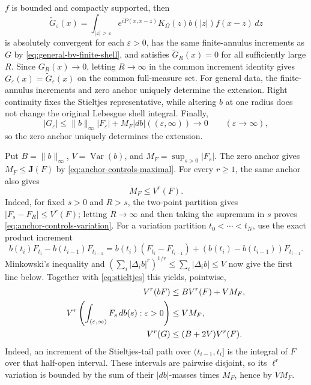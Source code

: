\documentclass[11pt]{article}
\numberwithin{equation}{section}
\theoremstyle{remark}
\theoremstyle{definition}
\newcommand{\Var}{\operatorname{Var}}
\newcommand{\norm}[1]{\lVert #1\rVert}
\begin{document}
\(f\) is bounded and compactly supported, then
\[
 \widetilde G_\varepsilon(x)
 =\int_{|z|>\varepsilon}e^{iP(x,x-z)}
   K_\Omega(z)b(|z|)f(x-z)\,dz
\]
is absolutely convergent for each \(\varepsilon>0\), has the same
finite-annulus increments as \(G\) by
\eqref{eq:general-bv-finite-shell}, and satisfies
\(\widetilde G_R(x)=0\) for all sufficiently large \(R\).  Since
\(G_R(x)\to0\), letting \(R\to\infty\) in the common increment identity
gives \(G_\varepsilon(x)=\widetilde G_\varepsilon(x)\) on the common
full-measure set.  For general data, the finite-annulus increments and
zero anchor uniquely determine the extension.  Right continuity fixes the
Stieltjes representative, while altering $b$ at one radius does not change
the original Lebesgue shell integral.  Finally,
\begin{equation}\label{eq:bv-anchor-explicit}
 |G_\varepsilon|
 \le\norm b_\infty|F_\varepsilon|
   +M_F|db|((\varepsilon,\infty))\longrightarrow0
 \qquad(\varepsilon\to\infty),
\end{equation}
so the zero anchor uniquely determines the extension.

Put $B=\norm b_\infty$, $V=\Var(b)$, and
$M_F=\sup_{s>0}|F_s|$.  The zero anchor gives
$M_F\le\mathbf J(F)$ by \eqref{eq:anchor-controls-maximal}.  For every
$r\ge1$, the same anchor also gives
\begin{equation}\label{eq:anchor-controls-variation}
 M_F\le V^r(F).
\end{equation}
Indeed, for fixed $s>0$ and $R>s$, the two-point partition gives
$|F_s-F_R|\le V^r(F)$; letting $R\to\infty$ and then taking the supremum
in $s$ proves \eqref{eq:anchor-controls-variation}.  For a variation
partition $t_0<\cdots<t_N$, use the exact product increment
\[
 b(t_i)F_{t_i}-b(t_{i-1})F_{t_{i-1}}
 =b(t_i)(F_{t_i}-F_{t_{i-1}})
  +(b(t_i)-b(t_{i-1}))F_{t_{i-1}}.
\]
Minkowski's inequality and
$(\sum_i|\Delta_i b|^r)^{1/r}\le\sum_i|\Delta_i b|\le V$ now give the
first line below.  Together with \eqref{eq:stieltjes} this yields,
pointwise,
\begin{align}
 V^r(bF)&\le B V^r(F)+VM_F,\notag\\
 V^r\left(\int_{(\varepsilon,\infty)}F_s\,db(s):\varepsilon>0\right)
 &\le VM_F,\notag\\
 V^r(G)&\le(B+2V)V^r(F).\label{eq:bv-variation}
\end{align}
Indeed, an increment of the Stieltjes-tail path over $(t_{i-1},t_i]$ is
the integral of $F$ over that half-open interval.  These intervals are
pairwise disjoint, so its $\ell^r$ variation is bounded by the sum of
their $|db|$-masses times $M_F$, hence by $VM_F$.
\end{document}
